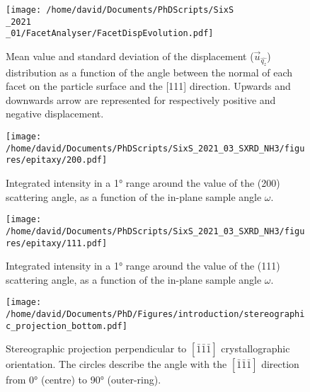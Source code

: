 \begin{figure}[!htb]
    \centering
    \texttt{[image: /home/david/Documents/PhDScripts/SixS\\\_2021\\\_01/FacetAnalyser/FacetDispEvolution.pdf]}
    \caption{
        Mean value and standard deviation of the displacement ($\vec{u}_{\hat{q_z}}$) distribution as a function of the angle between the normal of each facet on the particle surface and the [111] direction.
        Upwards and downwards arrow are represented for respectively positive and negative displacement.
    }
    \label{fig:AmaterasuDisplacement}
\end{figure}

\begin{figure}[!htb]
    \centering
    \texttt{[image: /home/david/Documents/PhDScripts/SixS\_2021\_03\_SXRD\_NH3/figures/epitaxy/200.pdf]}
    \caption{
        Integrated intensity in a \ang{1} range around the value of the (200) scattering angle, as a function of the in-plane sample angle $\omega$.
    }
    \label{fig:Epitaxy200}
\end{figure}

\begin{figure}[!htb]
    \centering
    \texttt{[image: /home/david/Documents/PhDScripts/SixS\_2021\_03\_SXRD\_NH3/figures/epitaxy/111.pdf]}
    \caption{
        Integrated intensity in a \ang{1} range around the value of the (111) scattering angle, as a function of the in-plane sample angle $\omega$.
    }
    \label{fig:Epitaxy111}
\end{figure}


\begin{figure}[!htb]
    \centering
    \texttt{[image: /home/david/Documents/PhD/Figures/introduction/stereographic\_projection\_bottom.pdf]}
    \caption{
        Stereographic projection perpendicular to $[\bar{1}\bar{1}\bar{1}]$ crystallographic orientation.
        The circles describe the angle with the $[\bar{1}\bar{1}\bar{1}]$ direction from \ang{0} (centre) to \ang{90} (outer-ring).
    }
    \label{fig:StereoBottom}
\end{figure}


